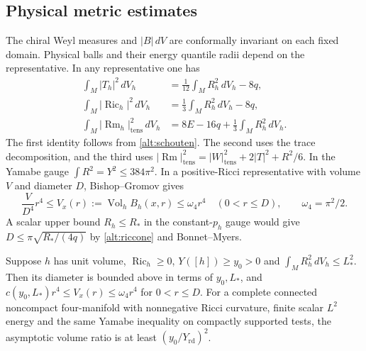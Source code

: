 \subsection{Physical metric estimates}

The chiral Weyl measures and \(|B|\,dV\) are conformally invariant
on each fixed domain. Physical balls and their energy quantile radii
depend on the representative. In any representative one has
\begin{equation}\label{alt:full-curvature}
 \begin{split}
 \int_M |T_h|^2\,dV_h&=\tfrac1{12}\int_M R_h^2\,dV_h-8q,\\
 \int_M |\operatorname{Ric}_h|^2\,dV_h
   &=\tfrac13\int_M R_h^2\,dV_h-8q,\\
 \int_M |\operatorname{Rm}_h|_{\mathrm{tens}}^2\,dV_h
   &=8E-16q+\tfrac13\int_M R_h^2\,dV_h .
 \end{split}
\end{equation}
The first identity follows from \eqref{alt:schouten}. The second uses
the trace decomposition, and the third uses
\(|\operatorname{Rm}|_{\mathrm{tens}}^2
=|W|_{\mathrm{tens}}^2+2|T|^2+R^2/6\).
In the Yamabe gauge \(\int R^2=Y^2\le384\pi^2\). In a positive-Ricci
representative with volume \(V\) and diameter \(D\), Bishop--Gromov gives
\[
 \frac{V}{D^4}r^4\le V_x(r):=\operatorname{Vol}_h B_h(x,r)
 \le \omega_4r^4\quad(0<r\le D),\qquad \omega_4=\pi^2/2.
\]
A scalar upper bound \(R_h\le R_*\) in the constant-\(p_h\) gauge
would give \(D\le\pi\sqrt{R_*/(4q)}\) by \eqref{alt:riccone} and
Bonnet--Myers.

\begin{proposition}
\label{alt:physical-balls}
Suppose \(h\) has unit volume, \(\operatorname{Ric}_h\ge0\),
\(Y([h])\ge y_0>0\) and \(\int_M R_h^2\,dV_h\le L_*^2\).
Then its diameter is bounded above in terms of \(y_0,L_*\), and
\(c(y_0,L_*)r^4\le V_x(r)\le\omega_4r^4\) for \(0<r\le D\).
For a complete connected noncompact four-manifold with
nonnegative Ricci curvature, finite scalar \(L^2\) energy
and the same Yamabe inequality on compactly supported tests,
the asymptotic volume ratio is at least \((y_0/Y_{\mathrm{rd}})^2\).
\end{proposition}

